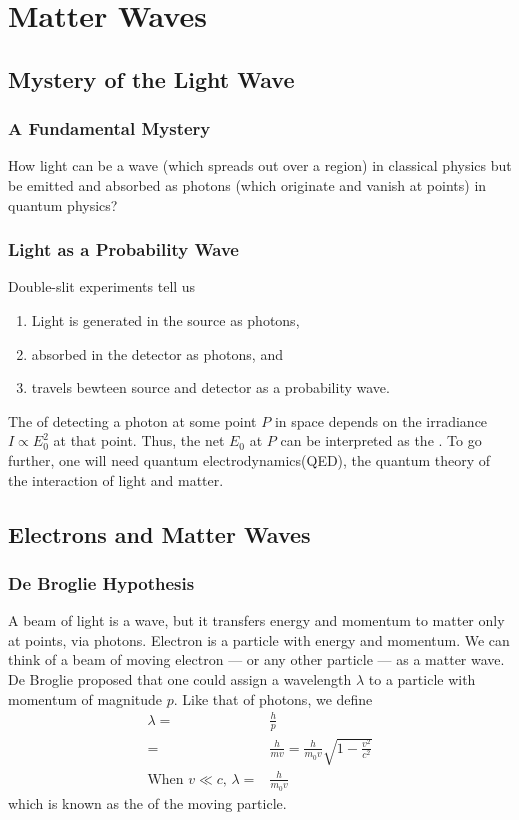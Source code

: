 \newpage
\section{Matter Waves}

\subsection{Mystery of the Light Wave}
\subsubsection{A Fundamental Mystery}
How light can be a wave (which spreads out over a region) in classical physics but be emitted and absorbed as photons (which originate and vanish at points) in quantum physics? 

\subsubsection{Light as a Probability Wave}
Double-slit experiments tell us
\begin{enumerate}
    \item Light is generated in the source as photons, 
    \item absorbed in the detector as photons, and
    \item travels bewteen source and detector as a probability wave. 
\end{enumerate}

The  of detecting a photon at some point $P$ in space depends on the irradiance $I\varpropto E_0^2$ at that point. Thus, the net $E_0$ at $P$ can be interpreted as the . To go further, one will need quantum electrodynamics(QED), the quantum theory of the interaction of light and matter. 


\subsection{Electrons and Matter Waves}
\subsubsection{De Broglie Hypothesis}
A beam of light is a wave, but it transfers energy and momentum to matter only at points, via photons. Electron is a particle with energy and momentum. We can think of a beam of moving electron --- or any other particle --- as a matter wave. De Broglie proposed that one could assign a wavelength $\lambda$ to a particle with momentum of magnitude $p$. Like that of photons, we define
\begin{align*}
    \lambda=&\frac{h}{p}\\
    =&\frac{h}{mv}=\frac{h}{m_0 v}\sqrt{1-\frac{v^2}{c^2}}\\
    \text{When }v \ll c,\,\lambda=&\frac{h}{m_0 v}
\end{align*}
which is known as the  of the moving particle. 

